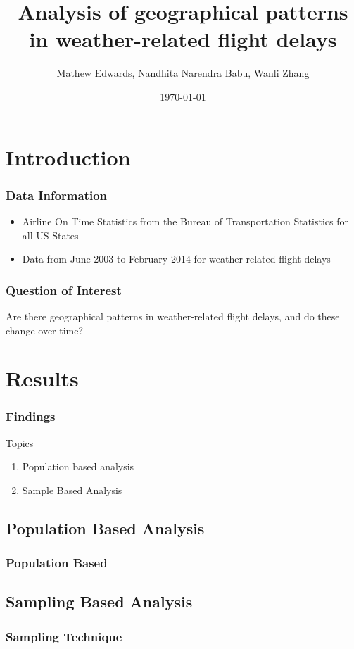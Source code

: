 \documentclass{beamer}
\title{Analysis of  geographical patterns in weather-related flight delays}
\author{Mathew Edwards, Nandhita Narendra Babu, Wanli Zhang}
\date{\today}
\begin{document}
\begin{frame}
\titlepage
\end{frame}

\begin{frame}{\contentsname}
\tableofcontents
\end{frame}

\section{Introduction}

\begin{frame}
\frametitle{Data Information}
\begin{itemize}
\item Airline On Time Statistics from the Bureau of Transportation Statistics for all US States
\item Data from June 2003 to February 2014 for weather-related flight delays
\end{itemize}
\end{frame}

\begin{frame}
\frametitle{Question of Interest}
Are there geographical patterns in weather-related flight delays, and do these change over time?
\end{frame}

\section{Results}
\begin{frame}
\frametitle{Findings}
Topics 
\begin{enumerate}
\item Population based analysis 
\item Sample Based Analysis
\end{enumerate}
\end{frame}

\subsection{Population Based Analysis}
\begin{frame}
\frametitle{Population Based}
\begin{center} 

\end{center}
\end{frame}

\subsection{Sampling Based Analysis}
\begin{frame}
\frametitle{Sampling Technique}
\begin{center} 
\end{center}
\end{frame}
\end{document}
